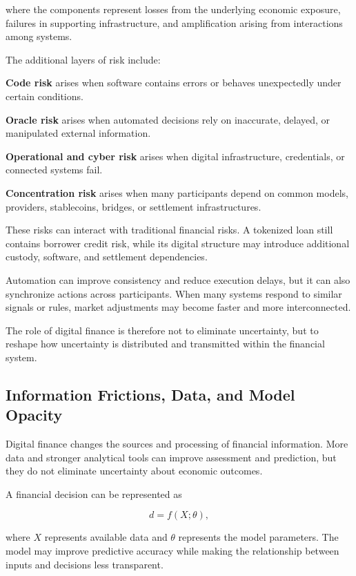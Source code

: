 where the components represent losses from the underlying economic exposure, failures in supporting infrastructure, and amplification arising from interactions among systems.

The additional layers of risk include:

\textbf{Code risk} arises when software contains errors or behaves unexpectedly under certain conditions.

\textbf{Oracle risk} arises when automated decisions rely on inaccurate, delayed, or manipulated external information.

\textbf{Operational and cyber risk} arises when digital infrastructure, credentials, or connected systems fail.

\textbf{Concentration risk} arises when many participants depend on common models, providers, stablecoins, bridges, or settlement infrastructures.

These risks can interact with traditional financial risks. A tokenized loan still contains borrower credit risk, while its digital structure may introduce additional custody, software, and settlement dependencies.

Automation can improve consistency and reduce execution delays, but it can also synchronize actions across participants. When many systems respond to similar signals or rules, market adjustments may become faster and more interconnected.

The role of digital finance is therefore not to eliminate uncertainty, but to reshape how uncertainty is distributed and transmitted within the financial system.

\subsection{Information Frictions, Data, and Model Opacity}

Digital finance changes the sources and processing of financial information. More data and stronger analytical tools can improve assessment and prediction, but they do not eliminate uncertainty about economic outcomes.

A financial decision can be represented as

\begin{equation}
d=f(X;\theta),
\label{eq:ch24-model-decision}
\end{equation}

where \(X\) represents available data and \(\theta\) represents the model parameters. The model may improve predictive accuracy while making the relationship between inputs and decisions less transparent.

